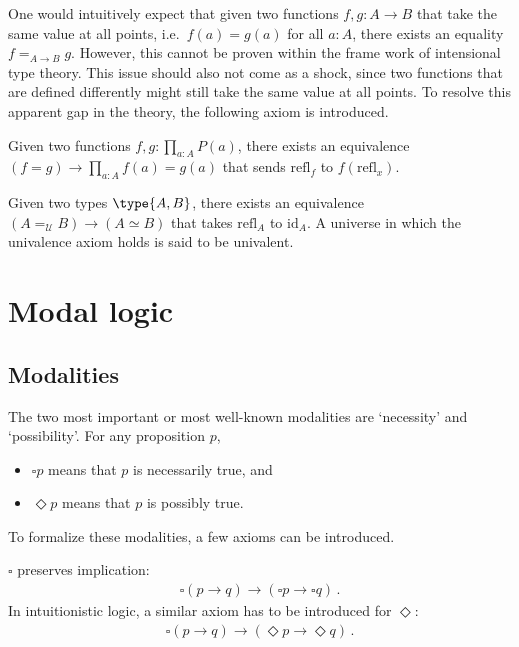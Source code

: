     One would intuitively expect that given two functions $f,g:A\rightarrow B$ that take the same value at all points, i.e.~$f(a)=g(a)$ for all $a:A$, there exists an equality $f=_{A\rightarrow B}g$. However, this cannot be proven within the frame work of intensional type theory. This issue should also not come as a shock, since two functions that are defined differently might still take the same value at all points. To resolve this apparent gap in the theory, the following axiom is introduced.
    \begin{axiom}
        Given two functions $f,g:\prod_{a:A}P(a)$, there exists an equivalence $(f=g)\rightarrow\prod_{a:A}f(a)=g(a)$ that sends $\mathrm{refl}_f$ to $f(\mathrm{refl}_x)$.
    \end{axiom}
    \begin{axiom}
        Given two types $\type{A,B}$, there exists an equivalence $(A=_{\mathcal{U}}B)\rightarrow(A\simeq B)$ that takes $\mathrm{refl}_A$ to $\mathrm{id}_A$. A universe in which the univalence axiom holds is said to be univalent.
    \end{axiom}


\section{Modal logic}\label{section:modal_logic}
\subsection{Modalities}

    The two most important or most well-known modalities are `necessity' and `possibility'. For any proposition $p$,
    \begin{itemize}
        \item $\square p$ means that $p$ is necessarily true, and
        \item $\Diamond p$ means that $p$ is possibly true.
    \end{itemize}
    To formalize these modalities, a few axioms can be introduced.

    \begin{axiom}[K]
        $\square$ preserves implication:
        \begin{gather}
            \square(p\rightarrow q)\rightarrow(\square p\rightarrow\square q)\,.
        \end{gather}
        In intuitionistic logic, a similar axiom has to be introduced for $\Diamond$:
        \begin{gather}
            \square(p\rightarrow q)\rightarrow(\Diamond p\rightarrow\Diamond q)\,.
        \end{gather}
    \end{axiom}

